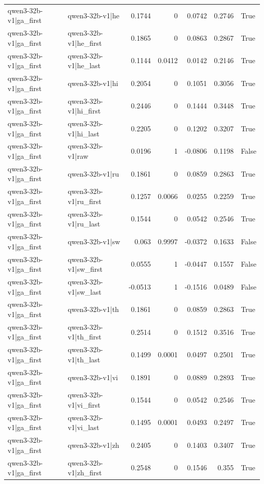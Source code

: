 \begin{table}
\begin{tabular}{l l r r r r l}
qwen3-32b-v1|ga_first & qwen3-32b-v1|he & 0.1744 & 0 & 0.0742 & 0.2746 & True \\
qwen3-32b-v1|ga_first & qwen3-32b-v1|he_first & 0.1865 & 0 & 0.0863 & 0.2867 & True \\
qwen3-32b-v1|ga_first & qwen3-32b-v1|he_last & 0.1144 & 0.0412 & 0.0142 & 0.2146 & True \\
qwen3-32b-v1|ga_first & qwen3-32b-v1|hi & 0.2054 & 0 & 0.1051 & 0.3056 & True \\
qwen3-32b-v1|ga_first & qwen3-32b-v1|hi_first & 0.2446 & 0 & 0.1444 & 0.3448 & True \\
qwen3-32b-v1|ga_first & qwen3-32b-v1|hi_last & 0.2205 & 0 & 0.1202 & 0.3207 & True \\
qwen3-32b-v1|ga_first & qwen3-32b-v1|raw & 0.0196 & 1 & -0.0806 & 0.1198 & False \\
qwen3-32b-v1|ga_first & qwen3-32b-v1|ru & 0.1861 & 0 & 0.0859 & 0.2863 & True \\
qwen3-32b-v1|ga_first & qwen3-32b-v1|ru_first & 0.1257 & 0.0066 & 0.0255 & 0.2259 & True \\
qwen3-32b-v1|ga_first & qwen3-32b-v1|ru_last & 0.1544 & 0 & 0.0542 & 0.2546 & True \\
qwen3-32b-v1|ga_first & qwen3-32b-v1|sw & 0.063 & 0.9997 & -0.0372 & 0.1633 & False \\
qwen3-32b-v1|ga_first & qwen3-32b-v1|sw_first & 0.0555 & 1 & -0.0447 & 0.1557 & False \\
qwen3-32b-v1|ga_first & qwen3-32b-v1|sw_last & -0.0513 & 1 & -0.1516 & 0.0489 & False \\
qwen3-32b-v1|ga_first & qwen3-32b-v1|th & 0.1861 & 0 & 0.0859 & 0.2863 & True \\
qwen3-32b-v1|ga_first & qwen3-32b-v1|th_first & 0.2514 & 0 & 0.1512 & 0.3516 & True \\
qwen3-32b-v1|ga_first & qwen3-32b-v1|th_last & 0.1499 & 0.0001 & 0.0497 & 0.2501 & True \\
qwen3-32b-v1|ga_first & qwen3-32b-v1|vi & 0.1891 & 0 & 0.0889 & 0.2893 & True \\
qwen3-32b-v1|ga_first & qwen3-32b-v1|vi_first & 0.1544 & 0 & 0.0542 & 0.2546 & True \\
qwen3-32b-v1|ga_first & qwen3-32b-v1|vi_last & 0.1495 & 0.0001 & 0.0493 & 0.2497 & True \\
qwen3-32b-v1|ga_first & qwen3-32b-v1|zh & 0.2405 & 0 & 0.1403 & 0.3407 & True \\
qwen3-32b-v1|ga_first & qwen3-32b-v1|zh_first & 0.2548 & 0 & 0.1546 & 0.355 & True \\

\end{tabular}
\end{table}

